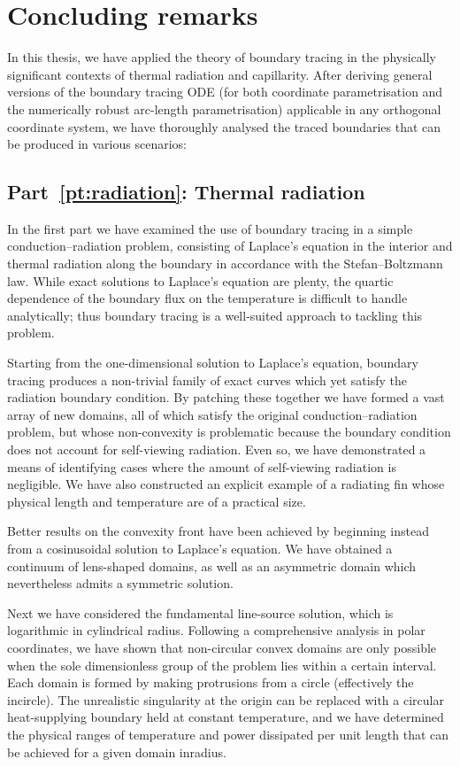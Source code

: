 \chapter{Concluding remarks}
\label{ch:concluding}

In this thesis,
we have applied the theory of boundary tracing
in the physically significant contexts
of thermal radiation and capillarity.
After deriving general versions of the boundary tracing ODE
(for both coordinate parametrisation
and the numerically robust arc-length parametrisation)
applicable in any orthogonal coordinate system,
we have thoroughly analysed
the traced boundaries that can be produced in various scenarios:

\section{Part~\ref*{pt:radiation}: Thermal radiation}
\label{sec:concluding.radiation}

In the first part we have examined the use of boundary tracing
in a simple conduction--radiation problem,
consisting of Laplace's equation in the interior
and thermal radiation along the boundary
in accordance with the Stefan--Boltzmann law.
While exact solutions to Laplace's equation are plenty,
the quartic dependence of the boundary flux on the temperature
is difficult to handle analytically;
thus boundary tracing is a well-suited approach to tackling this problem.

Starting from the one-dimensional solution to Laplace's equation,
boundary tracing produces a non-trivial family of exact curves
which yet satisfy the radiation boundary condition.
By patching these together
we have formed a vast array of new domains,
all of which satisfy the original conduction--radiation problem,
but whose non-convexity is problematic
because the boundary condition does not account for self-viewing radiation.
Even so, we have demonstrated a means of identifying cases
where the amount of self-viewing radiation is negligible.
We have also constructed an explicit example of a radiating fin
whose physical length and temperature are of a practical size.

Better results on the convexity front have been achieved
by beginning instead from a cosinusoidal solution to Laplace's equation.
We have obtained a continuum of lens-shaped domains,
as well as an asymmetric domain
which nevertheless admits a symmetric solution.

Next we have considered the fundamental line-source solution,
which is logarithmic in cylindrical radius.
Following a comprehensive analysis in polar coordinates,
we have shown that non-circular convex domains are only possible
when the sole dimensionless group of the problem
lies within a certain interval.
Each domain is formed by making protrusions from a circle
(effectively the incircle).
The unrealistic singularity at the origin
can be replaced with a circular heat-supplying boundary
held at constant temperature,
and we have determined the physical ranges
of temperature and power dissipated per unit length
that can be achieved for a given domain inradius.

